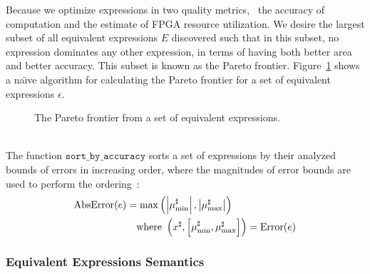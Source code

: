 Because we optimize expressions in two quality metrics, \ie~the accuracy of
computation and the estimate of FPGA resource utilization. We desire the
largest subset of all equivalent expressions $E$ discovered such that in this
subset, no expression dominates any other expression, in terms of having both
better area and better accuracy. This subset is known as the Pareto frontier.
Figure~\ref{alg:pareto} shows a na{\"\i}ve algorithm for calculating the Pareto
frontier for a set of equivalent expressions $\epsilon$.
\begin{figure}[ht]
    \centering
    \begin{algorithmic}
                \EndIf%
            \EndFor%
        \EndFunction%
    \end{algorithmic}
    \caption{The Pareto frontier from a set of equivalent expressions.
    }\label{alg:pareto}
\end{figure} \\
The function $\mathtt{sort\_by\_accuracy}$ sorts a set of expressions by their
analyzed bounds of errors in increasing order, where the magnitudes of error
bounds are used to perform the ordering~\cite{martel07}:
\begin{equation}
    \begin{aligned}
        \operatorname{\mathrm{AbsError}}(e) &= \max\left(
            \left| \mu^\sharp_{\min} \right|,
            \left| \mu^\sharp_{\max} \right|
        \right) \\
        & \quad \text{where~}
        \left(
            x^\sharp, \left[ \mu^\sharp_{\min}, \mu^\sharp_{\max} \right]
        \right) = \operatorname{\mathrm{Error}}(e)
    \end{aligned}
\end{equation}

\subsubsection{Equivalent Expressions Semantics}

